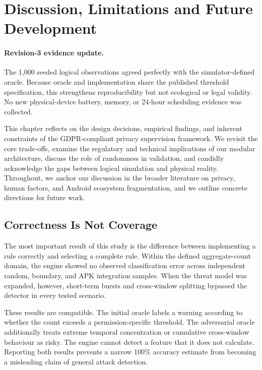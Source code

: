 \newpage
\section{Discussion, Limitations and Future Development}

\paragraph{Revision-3 evidence update.} The 1,000 seeded logical observations agreed perfectly with the simulator-defined oracle. Because oracle and implementation share the published threshold specification, this strengthens reproducibility but not ecological or legal validity. No new physical-device battery, memory, or 24-hour scheduling evidence was collected.

This chapter reflects on the design decisions, empirical findings, and inherent constraints of the GDPR‑compliant privacy supervision framework. We revisit the core trade‑offs, examine the regulatory and technical implications of our modular architecture, discuss the role of randomness in validation, and candidly acknowledge the gaps between logical simulation and physical reality. Throughout, we anchor our discussion in the broader literature on privacy, human factors, and Android ecosystem fragmentation, and we outline concrete directions for future work.

\subsection{Correctness Is Not Coverage}

The most important result of this study is the difference between implementing a rule correctly and selecting a complete rule. Within the defined aggregate-count domain, the engine showed no observed classification error across independent random, boundary, and APK integration samples. When the threat model was expanded, however, short-term bursts and cross-window splitting bypassed the detector in every tested scenario.

These results are compatible. The initial oracle labels a warning according to whether the count exceeds a permission-specific threshold. The adversarial oracle additionally treats extreme temporal concentration or cumulative cross-window behaviour as risky. The engine cannot detect a feature that it does not calculate. Reporting both results prevents a narrow 100\% accuracy estimate from becoming a misleading claim of general attack detection.

